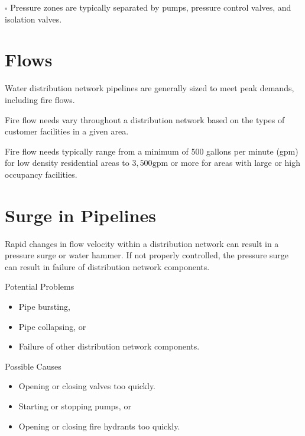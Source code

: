 \documentclass[10pt]{article}
\begin{document}
$\square$ Pressure zones are typically separated by pumps, pressure control valves, and isolation valves.

\section{Flows}
Water distribution network pipelines are generally sized to meet peak demands, including fire flows.

Fire flow needs vary throughout a distribution network based on the types of customer facilities in a given area.

Fire flow needs typically range from a minimum of 500 gallons per minute (gpm) for low density residential areas to $3,500 \mathrm{gpm}$ or more for areas with large or high occupancy facilities.

\section{Surge in Pipelines}
Rapid changes in flow velocity within a distribution network can result in a pressure surge or water hammer. If not properly controlled, the pressure surge can result in failure of distribution network components.

Potential Problems

\begin{itemize}
  \item Pipe bursting,

  \item Pipe collapsing, or

  \item Failure of other distribution network components.

\end{itemize}
Possible Causes

\begin{itemize}
  \item Opening or closing valves too quickly.

  \item Starting or stopping pumps, or

  \item Opening or closing fire hydrants too quickly.

\end{itemize}
\end{document}
